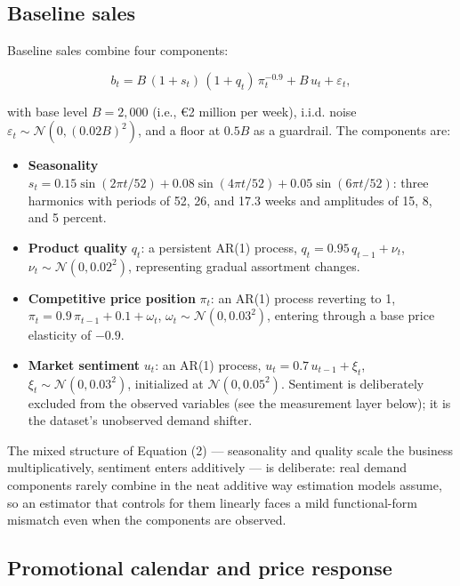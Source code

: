 \documentclass[
  conference]{IEEEtran}
\providecommand{\tightlist}{%
  \setlength{\itemsep}{0pt}\setlength{\parskip}{0pt}}
\begin{document}
\subsection{Baseline sales}\label{baseline-sales}

Baseline sales combine four components:

\[b_t = B \,(1 + s_t)\,(1 + q_t)\,\pi_t^{-0.9} + B\, u_t + \varepsilon_t, \tag{2}\]

with base level \(B = 2{,}000\) (i.e., €2 million per week), i.i.d.
noise \(\varepsilon_t \sim \mathcal{N}(0, (0.02B)^2)\), and a floor at
\(0.5B\) as a guardrail. The components are:

\begin{itemize}
\tightlist
\item
  \textbf{Seasonality}
  \(s_t = 0.15\sin(2\pi t/52) + 0.08\sin(4\pi t/52) + 0.05\sin(6\pi t/52)\):
  three harmonics with periods of 52, 26, and 17.3 weeks and amplitudes
  of 15, 8, and 5 percent.
\item
  \textbf{Product quality} \(q_t\): a persistent AR(1) process,
  \(q_t = 0.95\, q_{t-1} + \nu_t\),
  \(\nu_t \sim \mathcal{N}(0, 0.02^2)\), representing gradual assortment
  changes.
\item
  \textbf{Competitive price position} \(\pi_t\): an AR(1) process
  reverting to 1, \(\pi_t = 0.9\,\pi_{t-1} + 0.1 + \omega_t\),
  \(\omega_t \sim \mathcal{N}(0, 0.03^2)\), entering through a base
  price elasticity of \(-0.9\).
\item
  \textbf{Market sentiment} \(u_t\): an AR(1) process,
  \(u_t = 0.7\, u_{t-1} + \xi_t\),
  \(\xi_t \sim \mathcal{N}(0, 0.03^2)\), initialized at
  \(\mathcal{N}(0, 0.05^2)\). Sentiment is deliberately excluded from
  the observed variables (see the measurement layer below); it is the
  dataset's unobserved demand shifter.
\end{itemize}

The mixed structure of Equation (2) --- seasonality and quality scale
the business multiplicatively, sentiment enters additively --- is
deliberate: real demand components rarely combine in the neat additive
way estimation models assume, so an estimator that controls for them
linearly faces a mild functional-form mismatch even when the components
are observed.

\subsection{Promotional calendar and price
response}\label{promotional-calendar-and-price-response}
\end{document}
